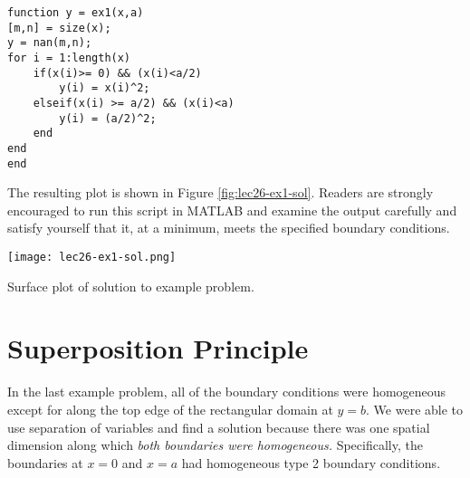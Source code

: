 \begin{lstlisting}[name=lec26-ex1,style=myMatlab]
%% Local functions
function y = ex1(x,a)
[m,n] = size(x);
y = nan(m,n);
for i = 1:length(x)
    if(x(i)>= 0) && (x(i)<a/2)
        y(i) = x(i)^2;
    elseif(x(i) >= a/2) && (x(i)<a)
        y(i) = (a/2)^2;
    end
end    
end
\end{lstlisting}
The resulting plot is shown in Figure \ref{fig:lec26-ex1-sol}.  Readers are strongly encouraged to run this script in MATLAB and examine the output carefully and satisfy yourself that it, at a minimum, meets the specified boundary conditions.
\begin{marginfigure}
\texttt{[image: lec26-ex1-sol.png]}
\caption{Surface plot of solution to example problem.}
\label{fig:lec26-ex1-sol}
\end{marginfigure}

\section{Superposition Principle}

In the last example problem, all of the boundary conditions were homogeneous except for along the top edge of the rectangular domain at $y=b$.  We were able to use separation of variables and find a solution because there was one spatial dimension along which \emph{both boundaries were homogeneous.}  Specifically, the boundaries at $x=0$ and $x=a$ had homogeneous type 2 boundary conditions.   

